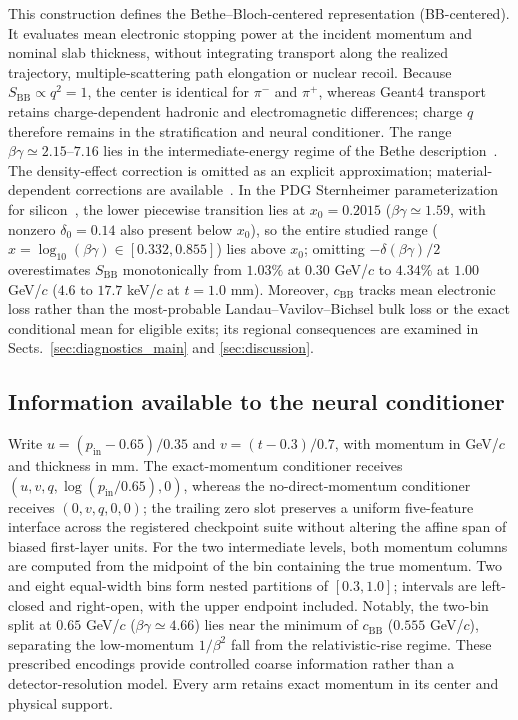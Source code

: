 \documentclass[twocolumn,epjc3]{svjour3}
\newcommand{\pin}{p_{\mathrm{in}}}
\begin{document}
This construction defines the Bethe--Bloch-centered representation
(BB-centered). It evaluates mean electronic stopping power at the incident
momentum and nominal slab thickness, without integrating transport along the
realized trajectory, multiple-scattering path elongation or nuclear recoil.
Because $S_{\mathrm{BB}}\propto q^2=1$, the center is identical for $\pi^-$
and $\pi^+$, whereas Geant4 transport retains charge-dependent hadronic and
electromagnetic differences; charge $q$ therefore remains in the stratification
and neural conditioner. The range $\beta\gamma\simeq2.15$--$7.16$ lies in the
intermediate-energy regime of the Bethe description~\cite{PDG2025}.
The density-effect correction is omitted as an explicit approximation;
material-dependent corrections are available~\cite{SternheimerBergerSeltzer1983}.
In the PDG Sternheimer parameterization for silicon~\cite{PDGSilicon2025}, the
lower piecewise transition lies at $x_0=0.2015$ ($\beta\gamma\simeq1.59$, with
nonzero $\delta_0=0.14$ also present below $x_0$), so the entire studied range
($x=\log_{10}(\beta\gamma)\in[0.332,0.855]$) lies above $x_0$; omitting
$-\delta(\beta\gamma)/2$ overestimates $S_{\mathrm{BB}}$ monotonically from
$1.03\%$ at $0.30$ GeV/$c$ to $4.34\%$ at $1.00$ GeV/$c$ ($4.6$ to $17.7$
keV/$c$ at $t=1.0$ mm). Moreover, $c_{\mathrm{BB}}$ tracks mean electronic loss
rather than the most-probable Landau--Vavilov--Bichsel bulk loss or the exact
conditional mean for eligible exits; its regional consequences are examined in
Sects.~\ref{sec:diagnostics_main} and \ref{sec:discussion}.

\subsection{Information available to the neural conditioner}
\label{sec:information_design}

Write $u=(\pin-0.65)/0.35$ and $v=(t-0.3)/0.7$, with momentum in
GeV/$c$ and thickness in mm. The exact-momentum conditioner receives
$(u,\allowbreak v,\allowbreak q,\allowbreak \log(\pin/0.65),0)$, whereas the no-direct-momentum conditioner
receives $(0,v,q,0,0)$; the trailing zero slot preserves a uniform five-feature
interface across the registered checkpoint suite without altering the affine
span of biased first-layer units. For the two intermediate levels, both momentum
columns are computed from the midpoint of the bin containing the true momentum.
Two and eight equal-width bins form nested partitions of $[0.3,1.0]$;
intervals are left-closed and right-open, with the upper endpoint included.
Notably, the two-bin split at $0.65$ GeV/$c$ ($\beta\gamma\simeq4.66$) lies
near the minimum of $c_{\mathrm{BB}}$ ($0.555$ GeV/$c$), separating the
low-momentum $1/\beta^2$ fall from the relativistic-rise regime.
These prescribed encodings provide controlled coarse information rather than
a detector-resolution model. Every arm retains exact momentum in its center
and physical support.
\end{document}

